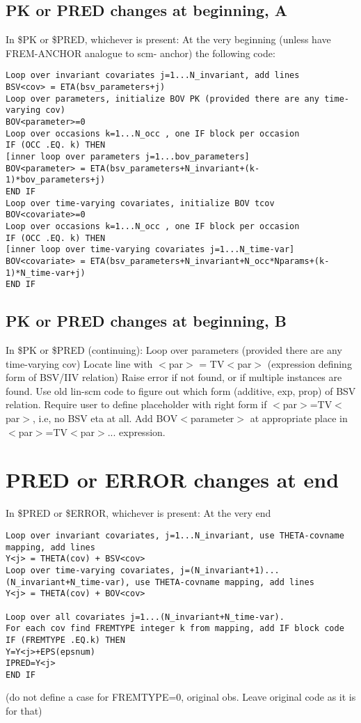 \documentclass[a4paper,12pt]{article}
\begin{document}
\subsection{PK or PRED changes at beginning, A}
In \$PK or \$PRED, whichever is present:
At the very beginning (unless have FREM-ANCHOR analogue to scm- anchor) the following code: 
\begin{verbatim}
Loop over invariant covariates j=1...N_invariant, add lines
BSV<cov> = ETA(bsv_parameters+j)
Loop over parameters, initialize BOV PK (provided there are any time-varying cov)
BOV<parameter>=0
Loop over occasions k=1...N_occ , one IF block per occasion
IF (OCC .EQ. k) THEN
[inner loop over parameters j=1...bov_parameters]
BOV<parameter> = ETA(bsv_parameters+N_invariant+(k-1)*bov_parameters+j)
END IF
Loop over time-varying covariates, initialize BOV tcov
BOV<covariate>=0
Loop over occasions k=1...N_occ , one IF block per occasion
IF (OCC .EQ. k) THEN
[inner loop over time-varying covariates j=1...N_time-var]
BOV<covariate> = ETA(bsv_parameters+N_invariant+N_occ*Nparams+(k-1)*N_time-var+j)
END IF
\end{verbatim}

\subsection{PK or PRED changes at beginning, B}
In \$PK or \$PRED (continuing):
Loop over parameters (provided there are any time-varying cov)
Locate line with 
$<$par$>$ = TV$<$par$>$ (expression defining form of BSV/IIV relation)
Raise error if not found, or if multiple instances are found. Use old lin-scm code to figure out which form (additive, exp, prop) of BSV relation. Require user to define placeholder with right form if $<$par$>$=TV$<$par$>$, i.e, no BSV eta at all. Add BOV$<$parameter$>$ at appropriate place in $<$par$>$=TV$<$par$>$... expression.

\section{PRED or ERROR changes at end}
In \$PRED or \$ERROR, whichever is present:
At the very end
\begin{verbatim}
Loop over invariant covariates, j=1...N_invariant, use THETA-covname mapping, add lines
Y<j> = THETA(cov) + BSV<cov>
Loop over time-varying covariates, j=(N_invariant+1)...(N_invariant+N_time-var), use THETA-covname mapping, add lines
Y<j> = THETA(cov) + BOV<cov>

Loop over all covariates j=1...(N_invariant+N_time-var).
For each cov find FREMTYPE integer k from mapping, add IF block code 
IF (FREMTYPE .EQ.k) THEN
Y=Y<j>+EPS(epsnum)
IPRED=Y<j>
END IF
\end{verbatim}
(do not define a case for FREMTYPE=0, original obs. Leave original code as it is for that)
\end{document}
